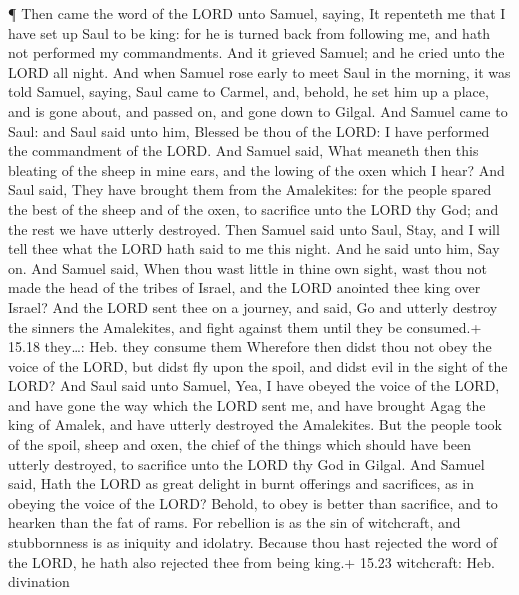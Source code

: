  ¶ Then came the word of the LORD unto Samuel, saying,
 It repenteth me that I have set up Saul to be king: for he
is turned back from following me, and hath not performed my
commandments. And it grieved Samuel; and he cried unto the LORD all
night.  And when Samuel rose early to meet Saul in the
morning, it was told Samuel, saying, Saul came to Carmel, and, behold,
he set him up a place, and is gone about, and passed on, and gone down
to Gilgal.  And Samuel came to Saul: and Saul said unto
him, Blessed be thou of the LORD: I have performed the commandment of
the LORD.  And Samuel said, What meaneth then this bleating
of the sheep in mine ears, and the lowing of the oxen which I hear?
 And Saul said, They have brought them from the Amalekites:
for the people spared the best of the sheep and of the oxen, to
sacrifice unto the LORD thy God; and the rest we have utterly destroyed.
 Then Samuel said unto Saul, Stay, and I will tell thee
what the LORD hath said to me this night. And he said unto him, Say on.
 And Samuel said, When thou wast little in thine own sight,
wast thou not made the head of the tribes of Israel, and the LORD
anointed thee king over Israel?  And the LORD sent thee on
a journey, and said, Go and utterly destroy the sinners the Amalekites,
and fight against them until they be consumed.+ 15.18 they\ldots: Heb.
they consume them  Wherefore then didst thou not obey the
voice of the LORD, but didst fly upon the spoil, and didst evil in the
sight of the LORD?  And Saul said unto Samuel, Yea, I have
obeyed the voice of the LORD, and have gone the way which the LORD sent
me, and have brought Agag the king of Amalek, and have utterly destroyed
the Amalekites.  But the people took of the spoil, sheep
and oxen, the chief of the things which should have been utterly
destroyed, to sacrifice unto the LORD thy God in Gilgal. 
And Samuel said, Hath the LORD as great delight in burnt offerings and
sacrifices, as in obeying the voice of the LORD? Behold, to obey is
better than sacrifice, and to hearken than the fat of rams.
 For rebellion is as the sin of witchcraft, and
stubbornness is as iniquity and idolatry. Because thou hast rejected the
word of the LORD, he hath also rejected thee from being king.+ 15.23
witchcraft: Heb. divination

